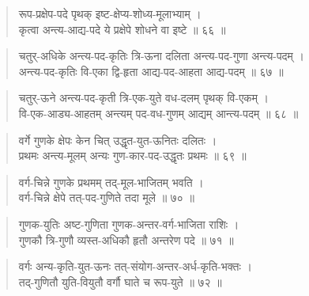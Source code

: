 \documentclass[11pt,a4paper]{article}
\newenvironment{shloka}{\begin{verse}\devanagarifont\large}{\end{verse}}
\begin{document}
\vspace{0.3cm}

\begin{shloka}
रूप-प्रक्षेप-पदे पृथक् इष्ट-क्षेप्य-शोध्य-मूलाभ्याम् ।\\
कृत्वा अन्त्य-आद्य-पदे ये प्रक्षेपे शोधने वा इष्टे ॥ ६६ ॥
\end{shloka}

\vspace{0.3cm}

\begin{shloka}
चतुर्-अधिके अन्त्य-पद-कृतिः त्रि-ऊना दलिता अन्त्य-पद-गुणा अन्त्य-पदम् ।\\
अन्त्य-पद-कृतिः वि-एका द्वि-हृता आद्य-पद-आहता आद्य-पदम् ॥ ६७ ॥
\end{shloka}

\vspace{0.3cm}

\begin{shloka}
चतुर्-ऊने अन्त्य-पद-कृती त्रि-एक-युते वध-दलम् पृथक् वि-एकम् ।\\
वि-एक-आड्य-आहतम् अन्त्यम् पद-वध-गुणम् आद्यम् आन्त्य-पदम् ॥ ६८ ॥
\end{shloka}

\vspace{0.3cm}

\begin{shloka}
वर्गे गुणके क्षेपः केन चित् उद्धृत-युत-ऊनितः दलितः ।\\
प्रथमः अन्त्य-मूलम् अन्यः गुण-कार-पद-उद्धृतः प्रथमः ॥ ६९ ॥
\end{shloka}

\vspace{0.3cm}

\begin{shloka}
वर्ग-चिन्ने गुणके प्रथमम् तद्-मूल-भाजितम् भवति ।\\
वर्ग-चिन्ने क्षेपे तत्-पद-गुणिते तदा मूले ॥ ७० ॥
\end{shloka}

\vspace{0.3cm}

\begin{shloka}
गुणक-युतिः अष्ट-गुणिता गुणक-अन्तर-वर्ग-भाजिता राशिः ।\\
गुणकौ त्रि-गुणौ व्यस्त-अधिकौ हृतौ अन्तरेण पदे ॥ ७१ ॥
\end{shloka}

\vspace{0.3cm}

\begin{shloka}
वर्गः अन्य-कृति-युत-ऊनः तत्-संयोग-अन्तर-अर्ध-कृति-भक्तः ।\\
तद्-गुणितौ युति-वियुतौ वर्गौ घाते च रूप-युते ॥ ७२ ॥
\end{shloka}
\end{document}
